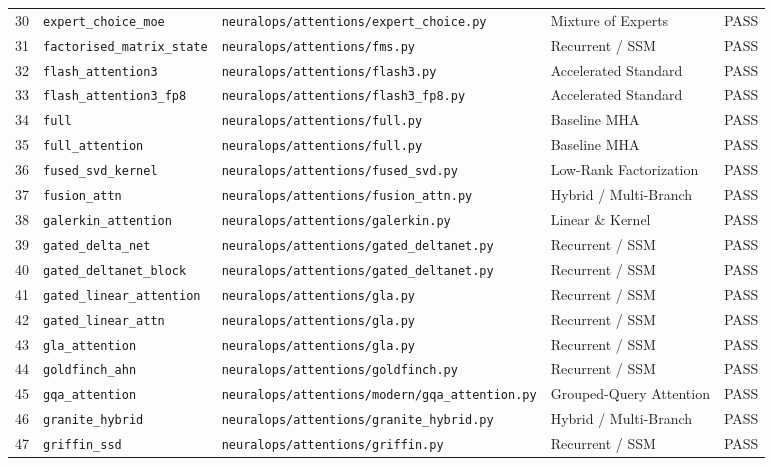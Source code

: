 \begin{center}
\begin{longtable}{rllll}
30 & \texttt{expert\_choice\_moe} & \texttt{neuralops/attentions/expert\_choice.py} & Mixture of Experts & PASS \\
31 & \texttt{factorised\_matrix\_state} & \texttt{neuralops/attentions/fms.py} & Recurrent / SSM & PASS \\
32 & \texttt{flash\_attention3} & \texttt{neuralops/attentions/flash3.py} & Accelerated Standard & PASS \\
33 & \texttt{flash\_attention3\_fp8} & \texttt{neuralops/attentions/flash3\_fp8.py} & Accelerated Standard & PASS \\
34 & \texttt{full} & \texttt{neuralops/attentions/full.py} & Baseline MHA & PASS \\
35 & \texttt{full\_attention} & \texttt{neuralops/attentions/full.py} & Baseline MHA & PASS \\
36 & \texttt{fused\_svd\_kernel} & \texttt{neuralops/attentions/fused\_svd.py} & Low-Rank Factorization & PASS \\
37 & \texttt{fusion\_attn} & \texttt{neuralops/attentions/fusion\_attn.py} & Hybrid / Multi-Branch & PASS \\
38 & \texttt{galerkin\_attention} & \texttt{neuralops/attentions/galerkin.py} & Linear \& Kernel & PASS \\
39 & \texttt{gated\_delta\_net} & \texttt{neuralops/attentions/gated\_deltanet.py} & Recurrent / SSM & PASS \\
40 & \texttt{gated\_deltanet\_block} & \texttt{neuralops/attentions/gated\_deltanet.py} & Recurrent / SSM & PASS \\
41 & \texttt{gated\_linear\_attention} & \texttt{neuralops/attentions/gla.py} & Recurrent / SSM & PASS \\
42 & \texttt{gated\_linear\_attn} & \texttt{neuralops/attentions/gla.py} & Recurrent / SSM & PASS \\
43 & \texttt{gla\_attention} & \texttt{neuralops/attentions/gla.py} & Recurrent / SSM & PASS \\
44 & \texttt{goldfinch\_ahn} & \texttt{neuralops/attentions/goldfinch.py} & Recurrent / SSM & PASS \\
45 & \texttt{gqa\_attention} & \texttt{neuralops/attentions/modern/gqa\_attention.py} & Grouped-Query Attention & PASS \\
46 & \texttt{granite\_hybrid} & \texttt{neuralops/attentions/granite\_hybrid.py} & Hybrid / Multi-Branch & PASS \\
47 & \texttt{griffin\_ssd} & \texttt{neuralops/attentions/griffin.py} & Recurrent / SSM & PASS \\

\end{longtable}
\end{center}
